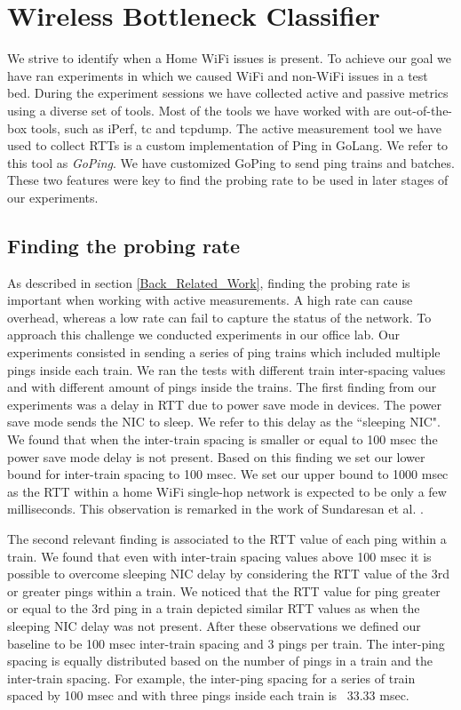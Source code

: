 \section{Wireless Bottleneck Classifier}\label{Wireless Bottleneck Detector}

We strive to identify when a Home WiFi issues is present. To achieve our goal we have ran experiments in which we caused WiFi and non-WiFi issues in a test bed.  During the experiment sessions we have collected active and passive metrics using a diverse set of tools. Most of the tools we have worked with are out-of-the-box tools, such as iPerf, tc and tcpdump. The active measurement tool we have used to collect RTTs is a custom implementation of Ping in GoLang. We refer to this tool as \emph{GoPing}. We have customized GoPing to send ping trains and batches. These two features were key to find the probing rate to be used in later stages of our experiments.

\subsection{Finding the probing rate}\label{probing_rate}

As described in section \ref{Back_Related_Work}, finding the probing rate is important when working with active measurements. A high rate can cause overhead, whereas a low rate can fail to capture the status of the network. To approach this challenge we conducted experiments in our office lab. Our experiments consisted in sending a series of ping trains which included multiple pings inside each train. We ran the tests with different train inter-spacing values and with different amount of pings inside the trains. The first finding from our experiments was a delay in RTT due to power save mode in devices. The power save mode sends the NIC to sleep. We refer to this delay as the ``sleeping NIC". We found that when the inter-train spacing is smaller or equal to 100 msec the power save mode delay is not present. Based on this finding we set our lower bound for inter-train spacing to 100 msec. We set our upper bound to 1000 msec as the RTT within a home WiFi single-hop network is expected to be only a few milliseconds. This observation is remarked in the work of Sundaresan et al. \cite{homeoraccesslink}.

The second relevant finding is associated to the RTT value of each ping within a train. We found that even with inter-train spacing values above 100 msec it is possible to overcome sleeping NIC delay by considering the RTT value of the 3rd or greater pings within a train. We noticed that the RTT value for ping greater or equal to the 3rd ping in a train depicted similar RTT values as when the sleeping NIC delay was not present. After these observations we defined our baseline to be 100 msec inter-train spacing and 3 pings per train. The inter-ping spacing is equally distributed based on the number of pings in a train and the inter-train spacing. For example, the inter-ping spacing for a series of train spaced by 100 msec and with three pings inside each train is ~33.33 msec.

